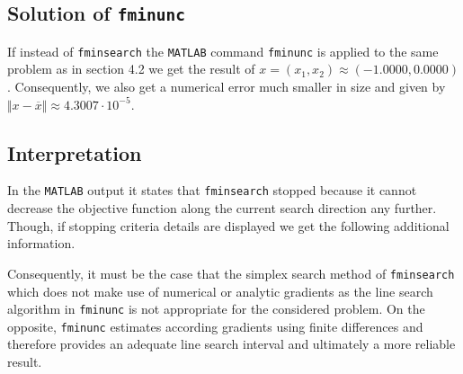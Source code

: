 \documentclass{article}
\begin{document}
	\subsection{Solution of \texttt{fminunc}}
	If instead of \texttt{fminsearch} the \texttt{MATLAB} command \texttt{fminunc} is applied to the same problem as in section 4.2 we get the result of $x=(x_1,x_2)\approx(-1.0000,0.0000)$. Consequently, we also get a numerical error much smaller in size and given by $\Vert x - \overline{x}\Vert \approx 4.3007\cdot 10^{-5}$.
	\subsection{Interpretation}
	In the \texttt{MATLAB} output it states that \texttt{fminsearch} stopped because it cannot decrease the objective function along the current search direction any further. Though, if stopping criteria details are displayed we get the following additional information.
	
	Consequently, it must be the case that the simplex search method of \texttt{fminsearch} which does not make use of numerical or analytic gradients as the line search algorithm in \texttt{fminunc} is not appropriate for the considered problem. On the opposite, \texttt{fminunc} estimates according gradients using finite differences and therefore provides an adequate line search interval and ultimately a more reliable result.
\end{document}
